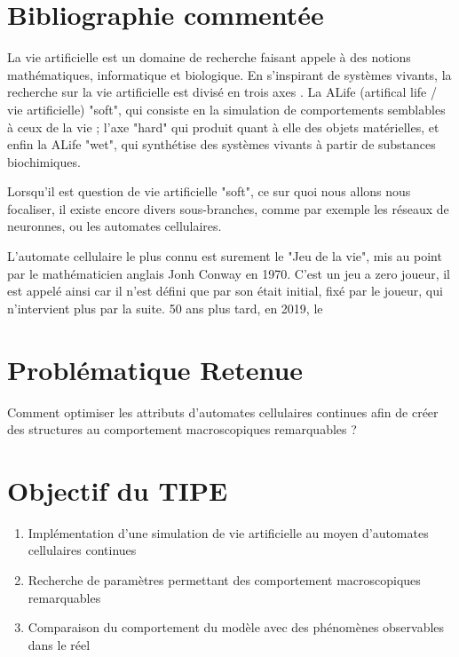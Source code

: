 \documentclass[a4paper, 11pt]{article}
\let\cite=\supercite
\begin{document}
\section*{Bibliographie comment\'ee}

La vie artificielle est un domaine de recherche faisant appele à des notions 
mathématiques, informatique et biologique. En s'inspirant de systèmes vivants, la
recherche sur la vie artificielle est divisé en trois axes \cite{artLife}. La ALife
(artifical life / vie artificielle) "soft", qui consiste en la simulation de
comportements semblables à ceux de la vie ; l'axe "hard" qui produit quant à elle des
objets matérielles, et enfin la ALife "wet", qui synthétise des systèmes vivants à
partir de substances biochimiques.

Lorsqu'il est question de vie artificielle "soft", ce sur quoi nous allons nous
focaliser, il existe encore divers sous-branches, comme par exemple les réseaux de
neuronnes, ou les automates cellulaires.

L'automate cellulaire le plus connu est surement le "Jeu de la vie", mis au point par
le mathématicien anglais Jonh Conway en 1970. C'est un jeu a zero joueur, il est appelé
ainsi car il n'est défini que par son était initial, fixé par le joueur, qui
n'intervient plus par la suite. 50 ans plus tard, en 2019, le


\section*{Probl\'ematique Retenue}

Comment optimiser les attributs d'automates cellulaires continues afin de créer des
structures au comportement macroscopiques remarquables ?

\section*{Objectif du TIPE}

\begin{enumerate}
    \item Implémentation d'une simulation de vie artificielle au moyen d'automates
        cellulaires continues
    \item Recherche de paramètres permettant des comportement macroscopiques
        remarquables
    \item Comparaison du comportement du modèle avec des phénomènes observables dans le
        réel
\end{enumerate}

\printbibliography[title=Références bibliographiques] 
\end{document}
